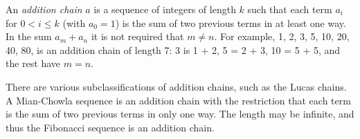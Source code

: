 \documentclass[12pt]{article}
\begin{document}
An {\em addition chain} $a$ is a sequence of integers of length $k$ such that each term $a_i$ for $0 < i \leq k$ (with $a_0 = 1$) is the sum of two previous terms in at least one way. In the sum $a_m + a_n$ it is not required that $m \neq n$. For example, 1, 2, 3, 5, 10, 20, 40, 80, is an addition chain of length 7: 3 is 1 + 2, 5 = 2 + 3, 10 = 5 + 5, and the rest have $m = n$.

There are various subclassifications of addition chains, such as the Lucas chains. A Mian-Chowla sequence is an addition chain with the restriction that each term is the sum of two previous terms in only one way. The length may be infinite, and thus the Fibonacci sequence is an addition chain.
\end{document}
